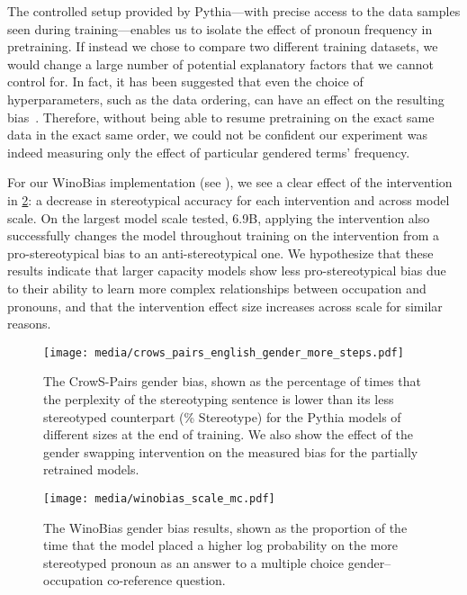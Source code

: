 \documentclass{article}
\theoremstyle{plain}
\theoremstyle{definition}
\theoremstyle{remark}
\begin{document}
The controlled setup provided by Pythia---with precise access to the data samples seen during training---enables us to isolate the effect of pronoun frequency in pretraining. If instead we chose to compare two different training datasets, we would change a large number of potential explanatory factors that we cannot control for. In fact, it has been suggested that even the choice of hyperparameters, such as the data ordering, can have an effect on the resulting bias~\citep{d2020underspecification}. Therefore, without being able to resume pretraining on the exact same data in the exact same order, we could not be confident our experiment was indeed measuring only the effect of particular gendered terms' frequency.



For our WinoBias implementation (see ), we see a clear effect of the intervention in \cref{figure:winobias_mc}: a decrease in stereotypical accuracy for each intervention and across model scale. On the largest model scale tested, 6.9B, applying the intervention also successfully changes the model throughout training on the intervention from a pro-stereotypical bias to an anti-stereotypical one. We hypothesize that these results indicate that larger capacity models show less pro-stereotypical bias due to their ability to learn more complex relationships between occupation and pronouns, and that the intervention effect size increases across scale for similar reasons.




\begin{figure}[!ht]
\centering
\texttt{[image: media/crows\_pairs\_english\_gender\_more\_steps.pdf]}
\caption{The CrowS-Pairs gender bias, shown as the percentage of times that the perplexity of the stereotyping sentence is lower than its less stereotyped counterpart (\% Stereotype) for the Pythia models of different sizes at the end of training. We also show the effect of the gender swapping intervention on the measured bias for the partially retrained models.}
\label{figure:crowspairs}
\end{figure}
\begin{figure}[!ht]
\centering
\texttt{[image: media/winobias\_scale\_mc.pdf]}
\caption{The WinoBias gender bias results, shown as the proportion of the time that the model placed a higher log probability on the more stereotyped pronoun as an answer to a multiple choice gender--occupation co-reference question.}
\label{figure:winobias_mc}
\end{figure}
\end{document}
